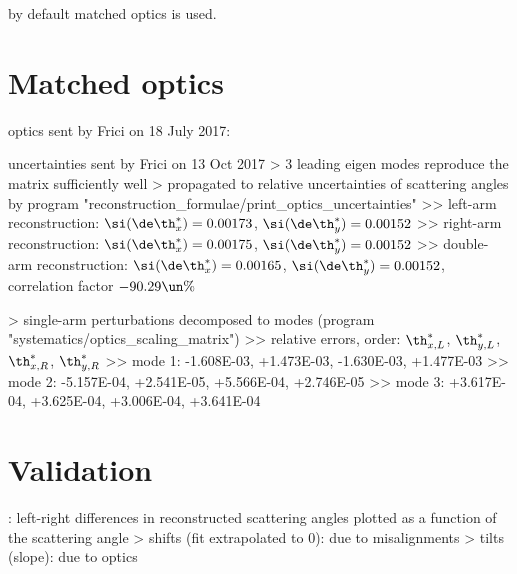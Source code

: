 \> by default matched optics is used.

\section[optics-matched]{Matched optics}

\> optics sent by Frici on 18 July 2017:

\centerline{\vbox{}}

\> uncertainties sent by Frici on 13 Oct 2017
\>> 3 leading eigen modes reproduce the matrix sufficiently well
\>> propagated to relative uncertainties of scattering angles by program "reconstruction\_formulae/print\_optics\_uncertainties"
\>>> left-arm reconstruction: $\si(\de\th^*_x) = 0.00173$, $\si(\de\th^*_y) = 0.00152$
\>>> right-arm reconstruction: $\si(\de\th^*_x) = 0.00175$, $\si(\de\th^*_y) = 0.00152$
\>>> double-arm reconstruction: $\si(\de\th^*_x) = 0.00165$, $\si(\de\th^*_y) = 0.00152$, correlation factor $-90.29\un{\%}$

\>> single-arm perturbations decomposed to modes (program "systematics/optics\_scaling\_matrix")
\>>> relative errors, order: $\th^*_{x,L}$, $\th^*_{y,L}$, $\th^*_{x,R}$, $\th^*_{y,R}$
\>>> mode 1: -1.608E-03, +1.473E-03, -1.630E-03, +1.477E-03
\>>> mode 2: -5.157E-04, +2.541E-05, +5.566E-04, +2.746E-05
\>>> mode 3: +3.617E-04, +3.625E-04, +3.006E-04, +3.641E-04


\section[optics-validation]{Validation}

\> : left-right differences in reconstructed scattering angles plotted as a function of the scattering angle
\>> shifts (fit extrapolated to 0): due to misalignments
\>> tilts (slope): due to optics



